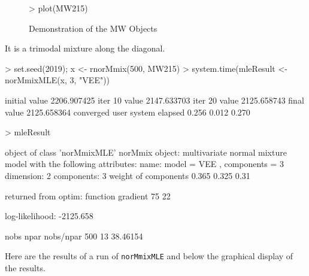 \begin{figure}
    \centering
\begin{Schunk}
\begin{Sinput}
>     plot(MW215)
\end{Sinput}
\end{Schunk}
    \caption{Demonstration of the MW Objects}
    \label{fig:demoMW}
\end{figure}

It is a trimodal mixture along the diagonal.

\begin{Schunk}
\begin{Sinput}
>     set.seed(2019); x <- rnorMmix(500, MW215)
>     system.time(mleResult <- norMmixMLE(x, 3, "VEE"))
\end{Sinput}
\begin{Soutput}
initial  value 2206.907425 
iter  10 value 2147.633703
iter  20 value 2125.658743
final  value 2125.658364 
converged
   user  system elapsed 
  0.256   0.012   0.270 
\end{Soutput}
\begin{Sinput}
>     mleResult
\end{Sinput}
\begin{Soutput}
object of class 'norMmixMLE' 
norMmix object: 
multivariate normal mixture model with the following attributes:
name: 		 model = VEE , components = 3 
 dimension:	 2 
 components:	 3 
weight of components 0.365 0.325 0.31 

returned from optim:
function gradient 
      75       22 

log-likelihood: -2125.658 
 
 nobs	npar	nobs/npar
 500 	 13 	 38.46154 
\end{Soutput}
\end{Schunk}

Here are the results of a run of {\tt norMmixMLE} and below the graphical 
display of the results.


